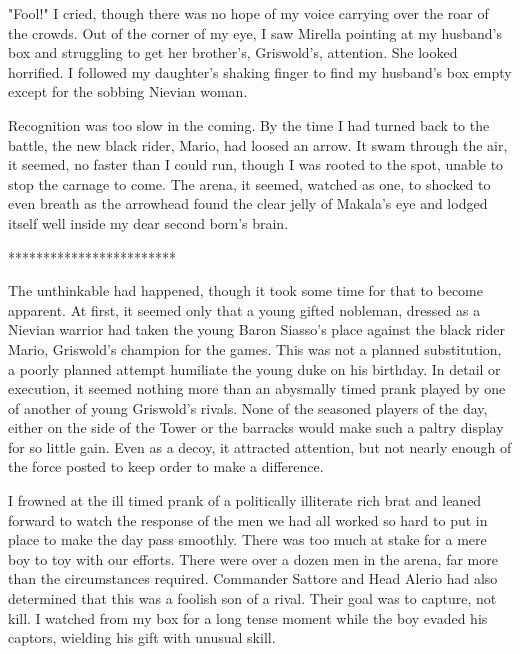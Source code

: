 \documentclass{article}
\begin{document}
"Fool!" I cried, though there was no hope of my voice carrying over the roar of the crowds. Out of the corner of my eye, I saw Mirella pointing at my husband's box and struggling to get her brother's, Griswold's, attention. She looked horrified. I followed my daughter's shaking finger to find my husband's box empty except for the sobbing Nievian woman.

Recognition was too slow in the coming. By the time I had turned back to the battle, the new black rider, Mario, had loosed an arrow. It swam through the air, it seemed, no faster than I could run, though I was rooted to the spot, unable to stop the carnage to come. The arena, it seemed, watched as one, to shocked to even breath as the arrowhead found the clear jelly of Makala's eye and lodged itself well inside my dear second born's brain.

************************

The unthinkable had happened, though it took some time for that to become apparent. At first, it seemed only that a young gifted nobleman, dressed as a Nievian warrior had taken the young Baron Siasso's place against the black rider Mario, Griswold's champion for the games. This was not a planned substitution, a poorly planned attempt humiliate the young duke on his birthday. In detail or execution, it seemed nothing more than an abysmally timed prank played by one of another of young Griswold's rivals. None of the seasoned players of the day, either on the side of the Tower or the barracks would make such a paltry display for so little gain. Even as a decoy, it attracted attention, but not nearly enough of the force posted to keep order to make a difference.

I frowned at the ill timed prank of a politically illiterate rich brat and leaned forward to watch the response of the men we had all worked so hard to put in place to make the day pass smoothly. There was too much at stake for a mere boy to toy with our efforts. There were over a dozen men in the arena, far more than the circumstances required. Commander Sattore and Head Alerio had also determined that this was a foolish son of a rival. Their goal was to capture, not kill. I watched from my box for a long tense moment while the boy evaded his captors, wielding his gift with unusual skill.
\end{document}
